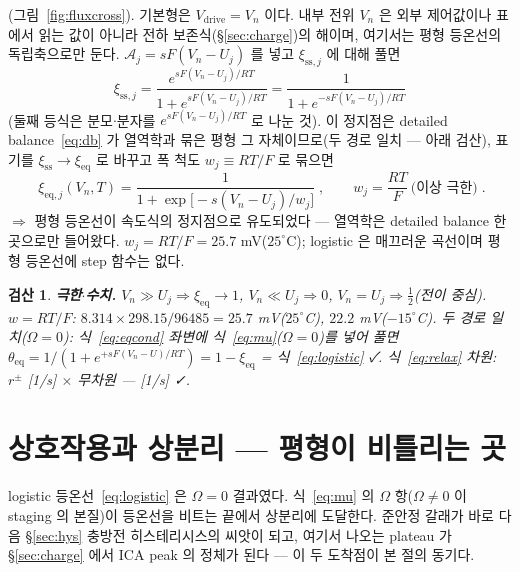 \documentclass[11pt,a4paper]{article}
\newtheorem*{verifybox}{검산}
\newcommand{\eq}{\mathrm{eq}}
\newcommand{\drive}{\mathrm{drive}}
\newcommand{\sstat}{\mathrm{ss}}
\begin{document}
(그림~\ref{fig:fluxcross}). 기본형은 $V_\drive=V_n$ 이다. 내부 전위 $V_n$ 은 외부 제어값이나 표에서 읽는 값이 아니라 전하 보존식(\S\ref{sec:charge})의 해이며, 여기서는 평형 등온선의 독립축으로만 둔다. $\mathcal A_j=sF(V_n-U_j)$ 를 넣고 $\xi_{\sstat,j}$ 에 대해 풀면
\begin{equation}
\xi_{\sstat,j}
=\frac{e^{sF(V_n-U_j)/RT}}{1+e^{sF(V_n-U_j)/RT}}
=\frac{1}{1+e^{-sF(V_n-U_j)/RT}}
\label{eq:logisticsolve}
\end{equation}
(둘째 등식은 분모$\cdot$분자를 $e^{sF(V_n-U_j)/RT}$ 로 나눈 것). 이 정지점은 detailed balance~\eqref{eq:db} 가 열역학과 묶은 평형 그 자체이므로(두 경로 일치 — 아래 검산), 표기를 $\xi_{\sstat}\to\xi_{\eq}$ 로 바꾸고 폭 척도 $w_j\equiv RT/F$ 로 묶으면
\begin{equation}
\boxed{\;\xi_{\eq,j}(V_n,T)=\frac{1}{1+\exp\!\big[-s(V_n-U_j)/w_j\big]}\;,\qquad
w_j=\frac{RT}{F}\ \text{(이상 극한)}\;.}
\label{eq:logistic}
\end{equation}
$\Rightarrow$ 평형 등온선이 속도식의 정지점으로 유도되었다 — 열역학은 detailed balance 한 곳으로만 들어왔다. $w_j=RT/F=25.7$ mV($25^\circ$C); logistic 은 매끄러운 곡선이며 평형 등온선에 step 함수는 없다.

\begin{verifybox}
\textbf{극한$\cdot$수치.} $V_n\gg U_j\Rightarrow\xi_{\eq}\to1$, $V_n\ll U_j\Rightarrow0$, $V_n=U_j\Rightarrow\tfrac12$(전이 중심). $w=RT/F$: $8.314\times298.15/96485=25.7$ mV($25^\circ$C), $22.2$ mV($-15^\circ$C). 두 경로 일치($\Omega=0$): 식~\eqref{eq:eqcond} 좌변에 식~\eqref{eq:mu}($\Omega=0$)를 넣어 풀면 $\theta_{\eq}=1/(1+e^{+sF(V_n-U)/RT})=1-\xi_{\eq}$ = 식~\eqref{eq:logistic} ✓. 식~\eqref{eq:relax} 차원: $r^\pm$ [1/s] $\times$ 무차원 — [1/s] ✓.
\end{verifybox}

\section{상호작용과 상분리 — 평형이 비틀리는 곳}\label{sec:regsol}
logistic 등온선~\eqref{eq:logistic} 은 $\Omega=0$ 결과였다. 식~\eqref{eq:mu} 의 $\Omega$ 항($\Omega\ne0$ 이 staging 의 본질)이 등온선을 비트는 끝에서 상분리에 도달한다. 준안정 갈래가 바로 다음 \S\ref{sec:hys} 충방전 히스테리시스의 씨앗이 되고, 여기서 나오는 plateau 가 \S\ref{sec:charge} 에서 ICA peak 의 정체가 된다 — 이 두 도착점이 본 절의 동기다.
\end{document}
